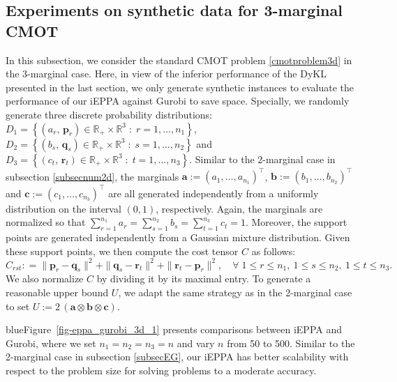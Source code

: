 \documentclass[10pt]{article}
\newcommand{\blue}[1]{\begin{color}{blue}#1\end{color}}
\newcommand{\R}{\mathbb R}
\newcommand{\norm}[1]{\left\lVert#1\right\rVert}
\def\norm#1{\|#1\|}
\begin{document}
\subsection{Experiments on synthetic data for 3-marginal CMOT}

In this subsection, we consider the standard CMOT problem \eqref{cmotproblem3d} in the 3-marginal case. Here, in view of the inferior performance of the DyKL presented in the last section, we only generate synthetic instances to evaluate the performance of our iEPPA against Gurobi to save space. Specially, we randomly generate three discrete probability distributions: $D_1=\left\{(a_r,\,\bm{p}_r)\in \R_+\times \R^3\;:\; r = 1,\dots, n_1 \right\}$, $D_2=\left\{(b_s,\,\bm{q}_s)\in \R_+\times \R^3\;:\; s = 1,\dots, n_2 \right\}$ and $D_3=\left\{(c_t,\,\bm{r}_t)\in \R_+\times \R^3\;:\; t = 1,\dots, n_3 \right\}$.
Similar to the 2-marginal case in subsection \ref{subsecnum2d}, the marginals $\bm{a}:=(a_1,\dots,a_{n_1})^{\top}$, $\bm{b}:=(b_1,\dots,b_{n_2})^{\top}$ and $\bm{c}:=(c_1,\dots,c_{n_3})^{\top}$ are all generated independently from a uniformly distribution on the interval $(0,1)$, respectively. Again, the marginals are normalized so that $\sum_{r=1}^{n_1}a_r=\sum_{s=1}^{n_2}b_s=\sum_{t=1}^{n_3}c_t=1$.  Moreover, the support points are generated independently from a Gaussian mixture distribution.
Given these support points, we  then compute the cost tensor $C$ as follows:
\begin{equation*}
C_{rst}: = \norm{\bm{p}_r-\bm{q}_s}^2+\norm{\bm{q}_s-\bm{r}_t}^2+\norm{\bm{r}_t-\bm{p}_r}^2,\quad \forall\;1\leq r\leq n_1,~1\leq s\leq n_2,~1\leq t\leq n_3.
\end{equation*}
We also normalize $C$ by dividing it by its maximal entry. To generate a reasonable upper bound $U$, we adapt the same strategy as in the 2-marginal case to set $U:=2\,(\bm{a} \otimes \bm{b} \otimes \bm{c})$. \blue{Figure~\ref{fig-eppa_gurobi_3d_1} presents comparisons between iEPPA and Gurobi, where we set $n_1 = n_2 = n_3 = n$ and vary $n$ from 50 to 500. Similar to the 2-marginal case in subsection \ref{subsecEG}, our iEPPA has better scalability with respect to the problem size for solving problems to a moderate accuracy. }
\end{document}
